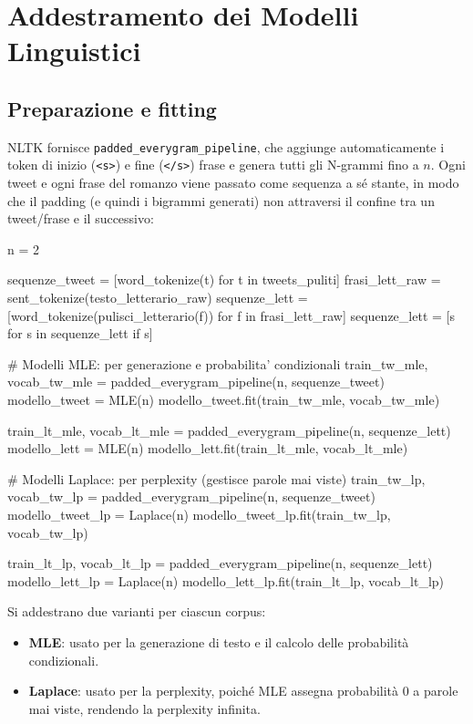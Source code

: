 ﻿\documentclass[12pt,a4paper]{article}
\begin{document}
\section{Addestramento dei Modelli Linguistici}
\label{sec:addestramento-lm}

\subsection{Preparazione e fitting}

NLTK fornisce \texttt{padded\_everygram\_pipeline}, che aggiunge automaticamente i token di inizio (\texttt{<s>}) e fine (\texttt{</s>}) frase e genera tutti gli N-grammi fino a $n$. Ogni tweet e ogni frase del romanzo viene passato come sequenza a sé stante, in modo che il padding (e quindi i bigrammi generati) non attraversi il confine tra un tweet/frase e il successivo:

\begin{pylisting}[title={Addestramento modelli MLE e Laplace per bigrammi ($n=2$)}]
n = 2

sequenze_tweet = [word_tokenize(t) for t in tweets_puliti]
frasi_lett_raw = sent_tokenize(testo_letterario_raw)
sequenze_lett  = [word_tokenize(pulisci_letterario(f)) for f in frasi_lett_raw]
sequenze_lett  = [s for s in sequenze_lett if s]

# Modelli MLE: per generazione e probabilita' condizionali
train_tw_mle, vocab_tw_mle = padded_everygram_pipeline(n, sequenze_tweet)
modello_tweet = MLE(n)
modello_tweet.fit(train_tw_mle, vocab_tw_mle)

train_lt_mle, vocab_lt_mle = padded_everygram_pipeline(n, sequenze_lett)
modello_lett = MLE(n)
modello_lett.fit(train_lt_mle, vocab_lt_mle)

# Modelli Laplace: per perplexity (gestisce parole mai viste)
train_tw_lp, vocab_tw_lp = padded_everygram_pipeline(n, sequenze_tweet)
modello_tweet_lp = Laplace(n)
modello_tweet_lp.fit(train_tw_lp, vocab_tw_lp)

train_lt_lp, vocab_lt_lp = padded_everygram_pipeline(n, sequenze_lett)
modello_lett_lp = Laplace(n)
modello_lett_lp.fit(train_lt_lp, vocab_lt_lp)
\end{pylisting}

Si addestrano due varianti per ciascun corpus:
\begin{itemize}
  \item \textbf{MLE}: usato per la generazione di testo e il calcolo delle probabilità condizionali.
  \item \textbf{Laplace}: usato per la perplexity, poiché MLE assegna probabilità 0 a parole mai viste, rendendo la perplexity infinita.
\end{itemize}
\end{document}
